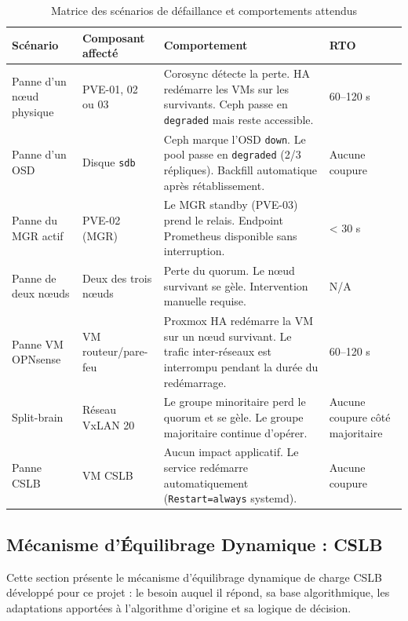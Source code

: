 \begin{table}[H]
\centering
\caption{Matrice des scénarios de défaillance et comportements attendus}
\label{tab:matrice-defaillance}
\begin{tabular}{|p{2.8cm}|p{2.5cm}|p{6.5cm}|p{1.8cm}|}
\hline
\textbf{Scénario} & \textbf{Composant affecté} & \textbf{Comportement} & \textbf{RTO} \\
\hline
Panne d'un nœud physique & PVE-01, 02 ou 03 & Corosync détecte la perte. HA redémarre les VMs sur les survivants. Ceph passe en \texttt{degraded} mais reste accessible. & 60--120 s \\
\hline
Panne d'un OSD & Disque \texttt{sdb} & Ceph marque l'OSD \texttt{down}. Le pool passe en \texttt{degraded} (2/3 répliques). Backfill automatique après rétablissement. & Aucune coupure \\
\hline
Panne du MGR actif & PVE-02 (MGR) & Le MGR standby (PVE-03) prend le relais. Endpoint Prometheus disponible sans interruption. & < 30 s \\
\hline
Panne de deux nœuds & Deux des trois nœuds & Perte du quorum. Le nœud survivant se gèle. Intervention manuelle requise. & N/A \\
\hline
Panne VM OPNsense & VM routeur/pare-feu & Proxmox HA redémarre la VM sur un nœud survivant. Le trafic inter-réseaux est interrompu pendant la durée du redémarrage. & 60--120 s \\
\hline
Split-brain & Réseau VxLAN 20 & Le groupe minoritaire perd le quorum et se gèle. Le groupe majoritaire continue d'opérer. & Aucune coupure côté majoritaire \\
\hline
Panne CSLB & VM CSLB & Aucun impact applicatif. Le service redémarre automatiquement (\texttt{Restart=always} systemd). & Aucune coupure \\
\hline
\end{tabular}
\end{table}

\subsection{Mécanisme d'Équilibrage Dynamique : CSLB}

\par Cette section présente le mécanisme d'équilibrage dynamique de charge CSLB développé pour ce projet : le besoin auquel il répond, sa base algorithmique, les adaptations apportées à l'algorithme d'origine et sa logique de décision.\\


